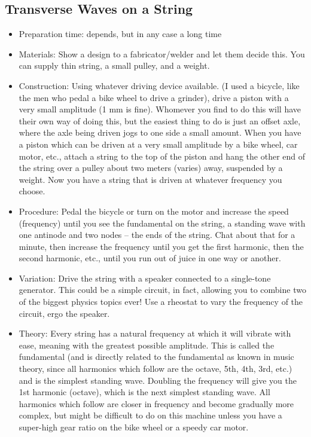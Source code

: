 \subsection{Transverse Waves on a String}
\begin{itemize}
\item{Preparation time: depends, but in any case a long time}
\item{Materials: Show a design to a fabricator/welder and let them decide this. You can supply thin string, a small pulley, and a weight.}
\item{Construction: Using whatever driving device available. (I used a bicycle, like the men who pedal a bike wheel to drive a grinder), drive a piston with a very small amplitude (1 mm is fine). Whomever you find to do this will have their own way of doing this, but the easiest thing to do is just an offset axle, where the axle being driven jogs to one side a small amount. When you have a piston which can be driven at a very small amplitude by a bike wheel, car motor, etc., attach a string to the top of the piston and hang the other end of the string over a pulley about two meters (varies) away, suspended by a weight. Now you have a string that is driven at whatever frequency you choose.}
\item{Procedure: Pedal the bicycle or turn on the motor and increase the speed (frequency) until you see the fundamental on the string, a standing wave with one antinode and two nodes – the ends of the string. Chat about that for a minute, then increase the frequency until you get the first harmonic, then the second harmonic, etc., until you run out of juice in one way or another.}
\item{Variation: Drive the string with a speaker connected to a single-tone generator. This could be a simple circuit, in fact, allowing you to combine two of the biggest physics topics ever! Use a rheostat to vary the frequency of the circuit, ergo the speaker.}
\item{Theory: Every string has a natural frequency at which it will vibrate with ease, meaning with the greatest possible amplitude. This is called the fundamental (and is directly related to the fundamental as known in music theory, since all harmonics which follow are the octave, 5th, 4th, 3rd, etc.) and is the simplest standing wave. Doubling the frequency will give you the 1st harmonic (octave), which is the next simplest standing wave. All harmonics which follow are closer in frequency and become gradually more complex, but might be difficult to do on this machine unless you have a super-high gear ratio on the bike wheel or a speedy car motor.}
\end{itemize}

